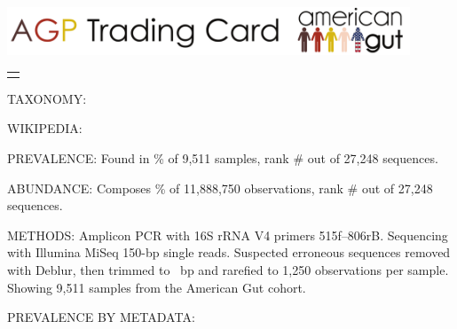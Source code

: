 \documentclass[10pt]{amsart}
\begin{document}


\begin{center}
\includegraphics[width=12cm]{../agp_header.pdf}
\end{center}

\hspace{2cm}
\begin{tabular}{L{5in}}
\texttt{\sequence{}}
\end{tabular}

\begin{raggedright}
\begin{hangparas}{2em}{1}
    TAXONOMY: \taxonomyGG{}
    
    WIKIPEDIA:  \wikipedia{}

    PREVALENCE: Found in \prevalencePercent{}\% of 9,511 samples, %
                rank \#\prevalenceRank{} out of 27,248 sequences. %

    ABUNDANCE:  Composes \abundancePercent{}\% of 11,888,750 observations,
                rank \#\abundanceRank{} out of 27,248 sequences. %
            
    METHODS:    Amplicon PCR with 16S rRNA V4 primers 515f--806rB.
    			Sequencing with Illumina MiSeq 150-bp single reads.
                Suspected erroneous sequences removed with Deblur, 
                then trimmed to \trimLength{}~bp and
                rarefied to 1,250 observations per sample. %
                Showing 9,511 samples from the American Gut cohort. %

\end{hangparas}

PREVALENCE BY METADATA:


\end{raggedright}
\end{document}
